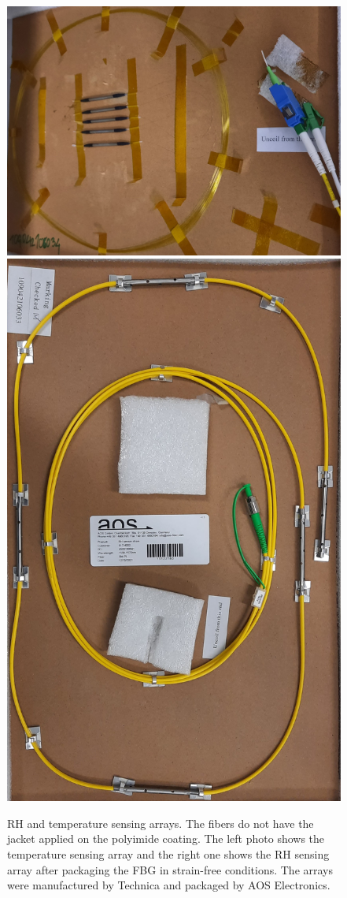 \begin{figure}[!h]
\centering
\includegraphics[angle=90,width=0.43\columnwidth]{Chapter5/images/t_array1.jpg}
\includegraphics[angle=90,width=0.52\columnwidth]{Chapter5/images/rh_array1.jpg}
\caption{\gls{RH} and temperature sensing arrays. The fibers do not have the jacket applied on the polyimide coating. The left photo shows the temperature sensing array and the right one shows the \gls{RH} sensing array after packaging the FBG in strain-free conditions. The arrays were manufactured by Technica and packaged by AOS Electronics.}
\label{fig_array_photo}
\end{figure}

